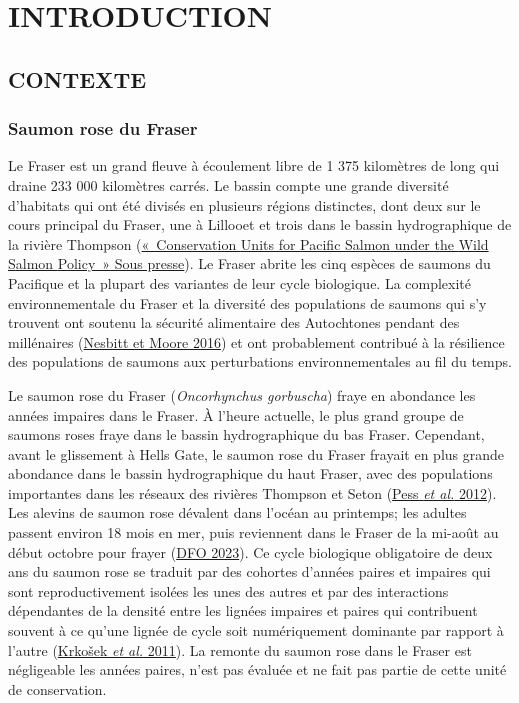 \documentclass[french,11pt]{book}
\begin{document}
\renewcommand{\tablename}{Tableau}
\frontmatter

\hypertarget{introduction}{%
\section{INTRODUCTION}\label{introduction}}

\hypertarget{contexte}{%
\subsection{CONTEXTE}\label{contexte}}

\hypertarget{saumon-rose-du-fraser}{%
\subsubsection{Saumon rose du Fraser}\label{saumon-rose-du-fraser}}

Le Fraser est un grand fleuve à écoulement libre de 1 375 kilomètres de long qui draine 233 000 kilomètres carrés. Le bassin compte une grande diversité d'habitats qui ont été divisés en plusieurs régions distinctes, dont deux sur le cours principal du Fraser, une à Lillooet et trois dans le bassin hydrographique de la rivière Thompson (\protect\hyperlink{ref-holtbyConservationUnitsPacific2008}{{«~Conservation {Units} for {Pacific Salmon} under the {W}ild {S}almon {P}olicy~»} Sous presse}). Le Fraser abrite les cinq espèces de saumons du Pacifique et la plupart des variantes de leur cycle biologique. La complexité environnementale du Fraser et la diversité des populations de saumons qui s'y trouvent ont soutenu la sécurité alimentaire des Autochtones pendant des millénaires (\protect\hyperlink{ref-nesbittSpeciesPopulationDiversity2016}{Nesbitt et Moore 2016}) et ont probablement contribué à la résilience des populations de saumons aux perturbations environnementales au fil du temps.

Le saumon rose du Fraser (\emph{Oncorhynchus gorbuscha}) fraye en abondance les années impaires dans le Fraser. À l'heure actuelle, le plus grand groupe de saumons roses fraye dans le bassin hydrographique du bas Fraser. Cependant, avant le glissement à Hells Gate, le saumon rose du Fraser frayait en plus grande abondance dans le bassin hydrographique du haut Fraser, avec des populations importantes dans les réseaux des rivières Thompson et Seton (\protect\hyperlink{ref-pessInfluencePopulationDynamics2012}{Pess \emph{et al.} 2012}). Les alevins de saumon rose dévalent dans l'océan au printemps; les adultes passent environ 18 mois en mer, puis reviennent dans le Fraser de la mi-août au début octobre pour frayer (\protect\hyperlink{ref-dfoSouthernSalmonIntegrated2023}{DFO 2023}). Ce cycle biologique obligatoire de deux ans du saumon rose se traduit par des cohortes d'années paires et impaires qui sont reproductivement isolées les unes des autres et par des interactions dépendantes de la densité entre les lignées impaires et paires qui contribuent souvent à ce qu'une lignée de cycle soit numériquement dominante par rapport à l'autre (\protect\hyperlink{ref-krkosek2011cycles}{Krkošek \emph{et al.} 2011}). La remonte du saumon rose dans le Fraser est négligeable les années paires, n'est pas évaluée et ne fait pas partie de cette unité de conservation.
\end{document}
